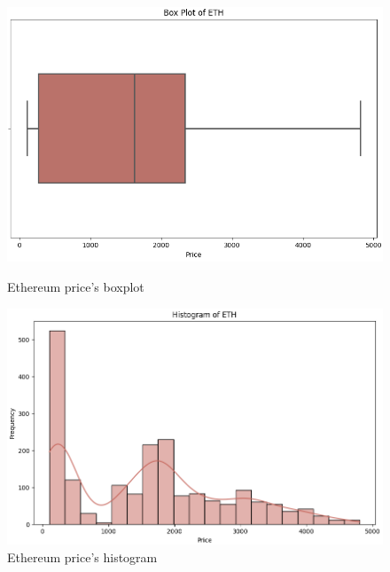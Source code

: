 \documentclass{ieeeojies}
\begin{document}
\begin{figure}[H]
	\centering
	\begin{minipage}{0.23\textwidth}
		\centering
		\includegraphics[width=1\textwidth]{bibliography/Images/BoxPlot_ETH.PNG}
		\caption{Ethereum price's boxplot}
		\label{fig:1}
	\end{minipage}
	\hfill
	\begin{minipage}{0.23\textwidth}
		\centering
		\includegraphics[width=1\textwidth]{bibliography/Images/Histogram_ETH.PNG}
		\caption{Ethereum price's histogram}
		\label{fig:2}
	\end{minipage}
\end{figure}
\end{document}
